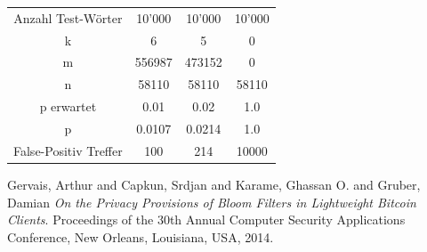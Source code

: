 \documentclass[a4paper, 12pt]{article}
\begin{document}
\begin{center}
\begin{tabular}{ |c|c|c|c| } 
 \hline
 Anzahl Test-W\"orter & 10'000 & 10'000 & 10'000 \\
 k & 6 & 5 & 0 \\ 
 m & 556987 & 473152 & 0 \\ 
 n & 58110 & 58110 & 58110 \\
 p erwartet & 0.01 & 0.02 & 1.0 \\ 
 p & 0.0107 & 0.0214 & 1.0 \\ 
 False-Positiv Treffer & 100 & 214 & 10000 \\ 
 \hline
\end{tabular}
\end{center}


\begin{thebibliography}{9}
Gervais, Arthur and Capkun, Srdjan and Karame, Ghassan O. and Gruber, Damian
\textit{On the Privacy Provisions of Bloom Filters in Lightweight Bitcoin Clients}. 
Proceedings of the 30th Annual Computer Security Applications Conference, New Orleans, Louisiana, USA, 2014.

\end{thebibliography}
 
\end{document}
